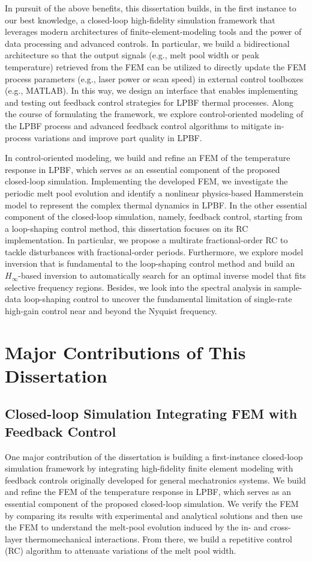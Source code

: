 \documentclass [11pt, proquest] {uwthesis}[2020/02/24]
\begin{document}
In pursuit of the above benefits, this dissertation builds, in the first
instance to our best knowledge, a closed-loop high-fidelity simulation
framework that leverages modern architectures of finite-element-modeling
tools and the power of data processing and advanced controls. In particular,
we build a bidirectional architecture so that the output signals (e.g.,
melt pool width or peak temperature) retrieved from the FEM can be
utilized to directly update the FEM process parameters (e.g., laser
power or scan speed) in external control toolboxes (e.g., MATLAB).
In this way, we design an interface that enables implementing
and testing out feedback control strategies for LPBF thermal processes. Along the course of formulating the framework, we explore control-oriented modeling of the LPBF process and advanced feedback control algorithms to mitigate in-process variations and improve part quality in LPBF.

In control-oriented modeling, we build and refine an FEM of the temperature response in LPBF, which serves as an essential component of the proposed closed-loop simulation. Implementing the developed FEM, we investigate the periodic melt pool evolution and identify a nonlinear physics-based Hammerstein model to represent the complex thermal dynamics in LPBF. In the other essential component of the closed-loop simulation, namely, feedback control, starting from a loop-shaping control method, this dissertation focuses on its RC implementation. In particular, we propose a multirate fractional-order RC to tackle disturbances with fractional-order periods. Furthermore, we explore model inversion that is fundamental to the loop-shaping control method and build an $H_\infty$-based inversion to automatically search for an optimal inverse model that fits selective frequency regions. Besides, we look into the spectral analysis in sample-data loop-shaping control to uncover the fundamental limitation of single-rate high-gain control near and beyond the Nyquist frequency.

\section*{Major Contributions of This Dissertation}

\subsection*{Closed-loop Simulation Integrating FEM with Feedback Control}
One major contribution of the dissertation is building a first-instance
closed-loop simulation framework by integrating high-fidelity finite
element modeling with feedback controls originally developed for general
mechatronics systems. We build and refine the FEM of the temperature response in LPBF, which serves as an essential component of the proposed closed-loop simulation. We verify the FEM by comparing its results with experimental
and analytical solutions and then use the FEM to understand the melt-pool
evolution induced by the in- and cross-layer thermomechanical interactions.
From there, we build a repetitive control (RC) algorithm to attenuate variations
of the melt pool width.
\end{document}
